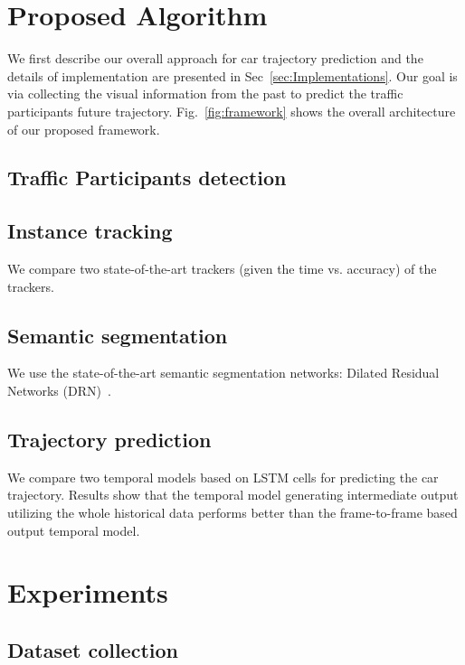 \documentclass[10pt,twocolumn,letterpaper]{article}
\begin{document}
\section{Proposed Algorithm}

We first describe our overall approach for car trajectory prediction and the details of implementation are presented in Sec~\ref{sec:Implementations}.
Our goal is via collecting the visual information from the past to predict the traffic participants future trajectory. Fig.~\ref{fig:framework} shows the overall architecture of our proposed framework.

\subsection{Traffic Participants detection}


\subsection{Instance tracking}

We compare two state-of-the-art trackers (given the time vs. accuracy) of the trackers.

\subsection{Semantic segmentation}
We use the state-of-the-art semantic segmentation networks: Dilated Residual Networks (DRN)~\cite{yu2017dilated}.

\subsection{Trajectory prediction}


We compare two temporal models based on LSTM cells for predicting the car trajectory.
Results show that the temporal model generating intermediate output utilizing the whole historical data performs better than the frame-to-frame based output temporal model.



\section{Experiments}

\subsection{Dataset collection}
\end{document}
